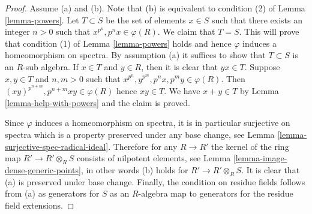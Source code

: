 \documentclass[10pt,a4paper]{amsart}
\theoremstyle{plain}
\theoremstyle{definition}
\theoremstyle{remark}
\numberwithin{equation}{subsection}
\begin{document}
\begin{proof}
Assume (a) and (b). Note that (b) is equivalent to condition (2)
of Lemma \ref{lemma-powers}. Let $T \subset S$ be the set of
elements $x \in S$ such that there exists an
integer $n > 0$ such that $x^{p^n} , p^n x \in \varphi(R)$.
We claim that $T = S$. This will prove that condition (1) of
Lemma \ref{lemma-powers} holds and hence $\varphi$ induces
a homeomorphism on spectra.
By assumption (a) it suffices to show that $T \subset S$ is an $R$-sub algebra.
If $x \in T$ and $y \in R$, then it is clear that $yx \in T$.
Suppose $x, y \in T$ and $n, m > 0$ such that
$x^{p^n}, y^{p^m}, p^n x, p^m y \in \varphi(R)$.
Then $(xy)^{p^{n + m}}, p^{n + m}xy \in \varphi(R)$
hence $xy \in T$. We have $x + y \in T$ by Lemma \ref{lemma-help-with-powers}
and the claim is proved.

\medskip\noindent
Since $\varphi$ induces a homeomorphism on spectra, it is in particular
surjective on spectra which is a property preserved under any base change, see
Lemma \ref{lemma-surjective-spec-radical-ideal}.
Therefore for any $R \to R'$ the kernel of the ring map
$R' \to R' \otimes_R S$ consists of nilpotent elements, see
Lemma \ref{lemma-image-dense-generic-points},
in other words (b) holds for $R' \to R' \otimes_R S$.
It is clear that (a) is preserved under base change.
Finally, the condition on residue fields follows from (a)
as generators for $S$ as an $R$-algebra map to generators for
the residue field extensions.
\end{proof}
\end{document}
